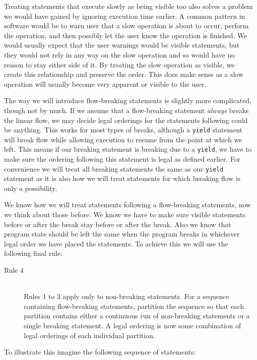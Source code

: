 \documentclass{report}
\begin{document}
Treating statements that execute slowly as being visible too also solves a problem we would have gained by ignoring execution time earlier. A common
pattern in software would be to warn user that a slow operation is about to occur, perform the operation, and then possibly let the user know the
operation is finished. We would usually expect that the user warnings would be visible statements, but they would not rely in any way on the slow
operation and so would have no reason to stay either side of it. By treating the slow operation as visible, we create this relationship and preserve
the order. This does make sense as a slow operation will usually become very apparent or visible to the user.

The way we will introduce flow-breaking statements is slightly more complicated, though not by much. If we assume that a flow-breaking statement
\textit{always} breaks the linear flow, we may decide legal orderings for the statements following could be anything. This works for most types of
breaks, although a \texttt{yield} statement will break flow while allowing execution to resume from the point at which we left. This means if our
breaking statement is breaking due to a \texttt{yield}, we have to make sure the ordering following this statement is legal as defined earlier.
For convenience we will treat all breaking statements the same as our \texttt{yield} statement as it is also how we will treat statements for which
breaking flow is only a possibility.

We know how we will treat statements following a flow-breaking statements, now we think about those before. We know we have to make sure visible
statements before or after the break stay before or after the break. Also we know that program state should be left the same when the program breaks
in whichever legal order we have placed the statements. To achieve this we will use the following final rule:

\begin{description}
\item[Rule 4] \hfill \\
Rules 1 to 3 apply only to non-breaking statements. For a sequence containing flow-breaking statements, partition the sequence so that each partition
contains either a continuous run of non-breaking statements or a single breaking statement. A legal ordering is now some combination of legal orderings
of each individual partition.
\end{description}

To illustrate this imagine the following sequence of statements:
\end{document}

